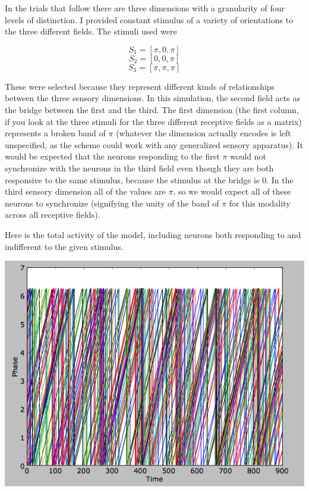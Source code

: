 \documentclass[12pt]{article}
\begin{document}
In the trials that follow there are three dimensions with a granularity of four levels of distinction.  I provided constant stimulus of a variety of orientations to the three different fields.  The stimuli used were

$$ S_1=[\pi,0,\pi] $$
$$ S_2=[0,0,\pi] $$
$$ S_3=[\pi,\pi,\pi] $$

These were selected because they represent different kinds of relationships between the three sensory dimensions.  In this simulation, the second field acts as the bridge between the first and the third.  The first dimension (the first column, if you look at the three stimuli for the three different receptive fields as a matrix) represents a broken band of $\pi$ (whatever the dimension actually encodes is left unspecified, as the scheme could work with any generalized sensory apparatus).  It would be expected that the neurons responding to the first $\pi$ would not synchronize with the neurons in the third field even though they are both responsive to the same stimulus, because the stimulus at the bridge is $0$.  In the third sensory dimension all of the values are $\pi$, so we would expect all of these neurons to synchronize (signifying the unity of the band of $\pi$ for this modality across all receptive fields).  

Here is the total activity of the model, including neurons both responding to and indifferent to the given stimulus.  

\vspace{15pt}
\includegraphics[scale=0.6]{totalactivity.png}
\vspace{15pt}
\end{document}
